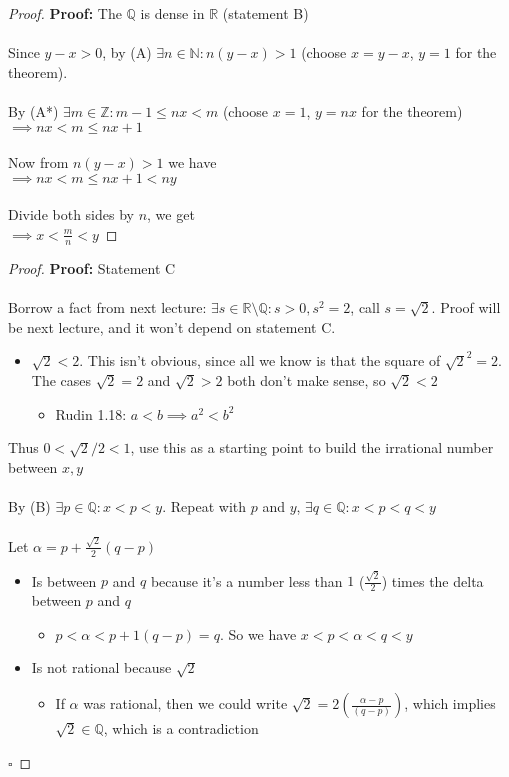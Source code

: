\documentclass{article}
\newcommand{\Z}{\mathbb{Z}}
\newcommand{\R}{\mathbb{R}}
\newcommand{\Q}{\mathbb{Q}}
\newcommand{\N}{\mathbb{N}}
\newcommand{\qed}{\null\nobreak\hfill\ensuremath{\square}}
\begin{document}
\begin{proof} 
\textbf{Proof:} The $\Q$ is dense in $\R$ (statement B)\\
~\\
Since $y-x>0$, by (A) $\exists n\in\N: n(y-x) > 1$ (choose $x=y-x$, $y=1$ for the theorem). \\ 
~\\
By (A*) $\exists m\in\Z: m-1 \le nx < m$ (choose $x=1$, $y=nx$ for the theorem) \\
$\implies nx  < m\le nx+1$ \\
~\\
Now from $n(y-x) > 1$ we have \\
$\implies nx < m \le nx+1 < ny$ \\
~\\
Divide both sides by $n$, we get \\
$\implies x < \frac{m}{n} < y$
\end{proof}
\begin{proof} 
\textbf{Proof:} Statement C \\
~\\
Borrow a fact from next lecture: $\exists s\in\R\setminus\Q: s>0, s^2=2$, call $s=\sqrt{2}$. Proof will be next lecture, and it won't depend on statement C.
\begin{itemize}
	\item $\sqrt{2} < 2$. This isn't obvious, since all we know is that the square of $\sqrt{2}^2 = 2$. The cases $\sqrt{2} = 2$ and $\sqrt{2} > 2$ both don't make sense, so $\sqrt{2} < 2$     
	\begin{itemize}
		\item Rudin 1.18: $a<b \implies a^2 < b^2$
	\end{itemize}
\end{itemize}
Thus $0< \sqrt{2}/2 < 1$, use this as a starting point to build the irrational number between $x,y$ \\
~\\
By (B) $\exists p\in\Q: x<p<y$. Repeat with $p$ and $y$, $\exists q\in\Q: x < p < q< y$ \\
~\\
Let $\alpha = p + \frac{\sqrt{2}}{2} (q-p)$
\begin{itemize}
	\item Is between $p$ and $q$ because it's a number less than $1$ ($ \frac{\sqrt{2}}{2}$) times the delta between $p$ and $q$
	\begin{itemize}
		\item $p<\alpha< p+1(q-p) = q$. So we have $x<p<\alpha<q<y$
        \end{itemize}
	\item Is not rational because $\sqrt{2}$ 
	\begin{itemize}
		\item If $\alpha$ was rational, then we could write $\sqrt{2} = 2(\frac{\alpha-p}{(q-p)})$, which implies $\sqrt{2} \in\Q$, which is a contradiction 
	\end{itemize}
\end{itemize}
\qed
\end{proof}
\end{document}
